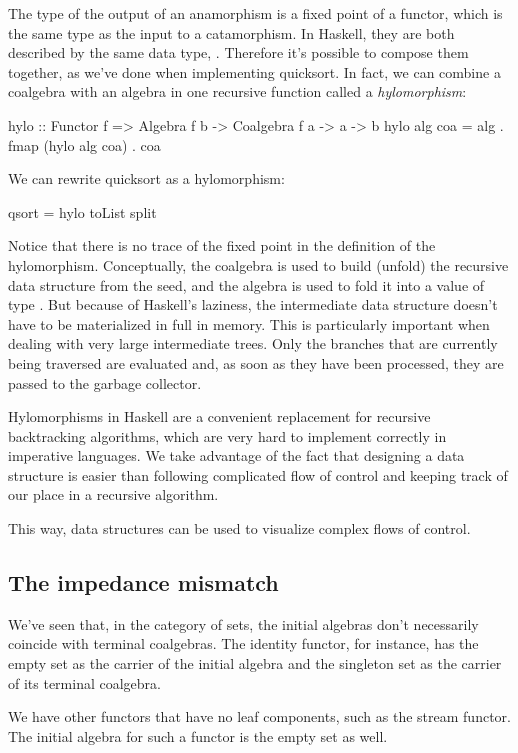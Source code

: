 \documentclass[DaoFP]{subfiles}
\begin{document}
The type of the output of an anamorphism is a fixed point of a functor, which is the same type as the input to a catamorphism. In Haskell, they are both described by the same data type, . Therefore it's possible to compose them together, as we've done when implementing quicksort. In fact, we can combine a coalgebra with an algebra in one recursive function called a \emph{hylomorphism}:
\begin{haskell}
hylo :: Functor f => Algebra f b -> Coalgebra f a -> a -> b
hylo alg coa = alg . fmap (hylo alg coa) . coa 
\end{haskell}
We can rewrite quicksort as a hylomorphism:
\begin{haskell}
qsort = hylo toList split
\end{haskell}

Notice that there is no trace of the fixed point in the definition of the hylomorphism. Conceptually, the coalgebra is used to build (unfold) the recursive data structure from the seed, and the algebra is used to fold it into a value of type . But because of Haskell's laziness, the intermediate data structure doesn't have to be materialized in full in memory. This is particularly important when dealing with very large intermediate trees. Only the branches that are currently being traversed are evaluated and, as soon as they have been processed, they are passed to the garbage collector. 

Hylomorphisms in Haskell are a convenient replacement for recursive backtracking algorithms, which are very hard to implement correctly in imperative languages. We take advantage of the fact that designing a data structure is easier than following complicated flow of control and keeping track of our place in a recursive algorithm. 

This way, data structures can be used to visualize complex flows of control.

\subsection{The impedance mismatch}
We've seen that, in the category of sets, the initial algebras don't necessarily coincide with terminal coalgebras. The identity functor, for instance, has the empty set as the carrier of the initial algebra and the singleton set as the carrier of its terminal coalgebra. 

We have other functors that have no leaf components, such as the stream functor. The initial algebra for such a functor is the empty set as well. 
\end{document}
